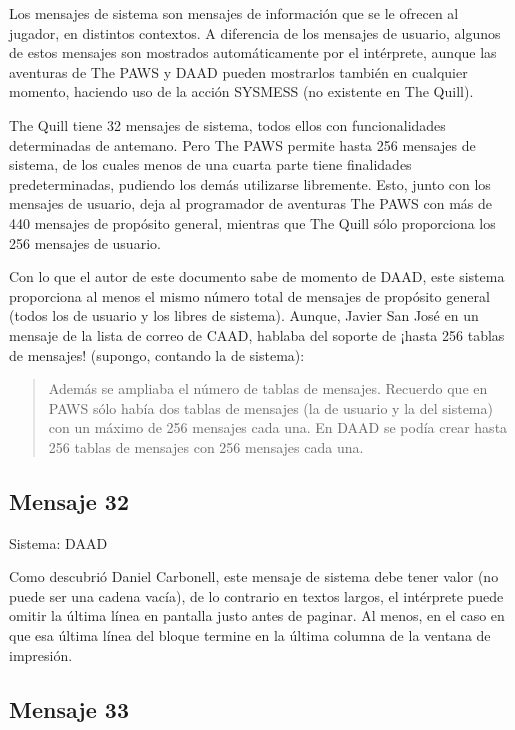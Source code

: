 \documentclass[11pt, a5paper]{article}
\newcommand{\quill}{\textsf{The Quill}\xspace}
\newcommand{\paw}{\textsf{The PAWS}\xspace}
\newcommand{\daad}{\textsf{DAAD}\xspace}
\newcommand{\sistema}[1]{\noindent Sistema: #1 \nopagebreak}
\begin{document}
Los mensajes de sistema son mensajes de información que se le ofrecen al jugador, en distintos contextos. A diferencia de los mensajes de usuario, algunos de estos mensajes son mostrados automáticamente por el intérprete, aunque las aventuras de \paw y \daad pueden mostrarlos también en cualquier momento, haciendo uso de la acción SYSMESS (no existente en \quill).

\quill tiene 32 mensajes de sistema, todos ellos con funcionalidades determinadas de antemano. Pero \paw permite hasta 256 mensajes de sistema, de los cuales menos de una cuarta parte tiene finalidades predeterminadas, pudiendo los demás utilizarse libremente. Esto, junto con los mensajes de usuario, deja al programador de aventuras \paw con más de 440 mensajes de propósito general, mientras que \quill sólo proporciona los 256 mensajes de usuario.

Con lo que el autor de este documento sabe de momento de \daad, este sistema proporciona al menos el mismo número total de mensajes de propósito general (todos los de usuario y los libres de sistema). Aunque, Javier San José en un mensaje \cite{JSJ} de la lista de correo de CAAD, hablaba del soporte de ¡hasta 256 tablas de mensajes! (supongo, contando la de sistema):

\begin{quote}
\guillemotleft Además se ampliaba el número de tablas de mensajes. Recuerdo que en PAWS sólo había dos tablas de mensajes (la de usuario y la del sistema) con un máximo de 256 mensajes cada una. En \daad se podía crear hasta 256 tablas de mensajes con 256 mensajes cada una.\guillemotright
\end{quote}

\subsection{Mensaje 32}

\sistema{\daad}

Como descubrió Daniel Carbonell, este mensaje de sistema debe tener valor (no puede ser una cadena vacía), de lo contrario en textos largos, el intérprete puede omitir la última línea en pantalla justo antes de paginar. Al menos, en el caso en que esa última línea del bloque termine en la última columna de la ventana de impresión.

\subsection{Mensaje 33}
\end{document}
